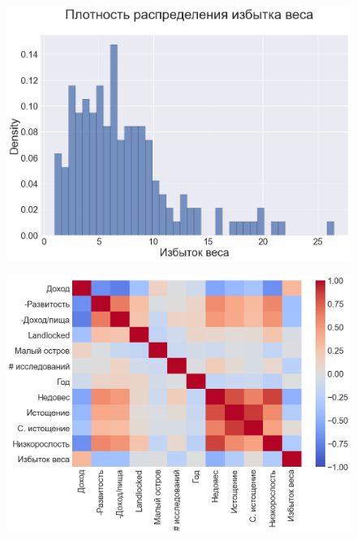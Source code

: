 \documentclass{beamer}
\begin{document}
\begin{frame}

\begin{figure}
	\centering
	\includegraphics[width=120mm]{8.png}
\end{figure}


\end{frame}



\begin{frame}

\begin{figure}
	\centering
	\includegraphics[width=120mm]{9.png}
\end{figure}


\end{frame}
\end{document}
